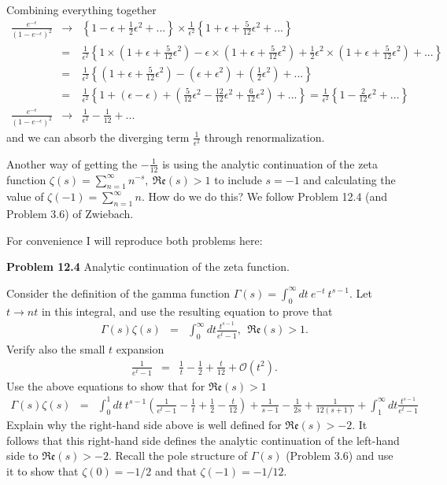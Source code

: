 \documentclass[aps,preprint,preprintnumbers,nofootinbib,showpacs,prd]{revtex4-1}
\newcommand{\nbea}{\begin{eqnarray*}}
\newcommand{\neea}{\end{eqnarray*}}
\begin{document}
Combining everything together
%
\nbea
\frac{e^{-\epsilon}}{(1-e^{-\epsilon})^2} & \rightarrow & \left \{ 1 - \epsilon + \frac{1}{2} \epsilon^2 + ... \right \} \times \frac{1}{\epsilon^2} \left \{ 1 + \epsilon + \frac{5}{12}\epsilon^2 + ... \right \} \\
& = & \frac{1}{\epsilon^2} \left \{ 1 \times \left ( 1 + \epsilon + \frac{5}{12}\epsilon^2 \right ) - \epsilon \times \left ( 1 + \epsilon + \frac{5}{12}\epsilon^2 \right ) + \frac{1}{2}\epsilon^2 \times \left ( 1 + \epsilon + \frac{5}{12}\epsilon^2 \right ) + ... \right \} \\
& = & \frac{1}{\epsilon^2} \left \{ \left ( 1 + \epsilon + \frac{5}{12}\epsilon^2 \right ) - \left ( \epsilon + \epsilon^2 \right ) + \left ( \frac{1}{2}\epsilon^2 \right ) + ... \right \} \\
& = & \frac{1}{\epsilon^2} \left \{ 1 + \left ( \epsilon - \epsilon \right ) + \left ( \frac{5}{12}\epsilon^2 - \frac{12}{12}\epsilon^2 + \frac{6}{12}\epsilon^2 \right ) + ... \right \} = \frac{1}{\epsilon^2} \left \{ 1 - \frac{2}{12}\epsilon^2  + ... \right \} \\
\frac{e^{-\epsilon}}{(1-e^{-\epsilon})^2} & \rightarrow & \frac{1}{\epsilon^2} - \frac{1}{12} + ...
\neea
%
and we can absorb the diverging term $\frac{1}{\epsilon^2}$ through renormalization.

Another way of getting the $-\frac{1}{12}$ is using the analytic continuation of the zeta function $\zeta(s) = \sum\limits_{n=1}^{\infty} n^{-s},~\mathfrak{Re}(s) > 1$ to include $s = -1$ and calculating the value of $\zeta(-1) = \sum\limits_{n=1}^{\infty} n$. How do we do this? We follow Problem 12.4 (and Problem 3.6) of Zwiebach. 

For convenience I will reproduce both problems here:

{\bf Problem 12.4} Analytic continuation of the zeta function.

Consider the definition of the gamma function $\Gamma(s) = \int_0^\infty dt ~e^{-t}~t^{s-1}$. Let $t \rightarrow nt$ in this integral, and use the resulting equation to prove that
%
\nbea
\Gamma(s)\zeta(s) & = & \int_0^\infty dt \frac{t^{s-1}}{e^t - 1}, ~~\mathfrak{Re}(s) > 1.
\neea
%
Verify also the small $t$ expansion
%
\nbea
\frac{1}{e^t-1} & = & \frac{1}{t} - \frac{1}{2} + \frac{t}{12} + \mathcal{O}(t^2).
\neea
%
Use the above equations to show that for $\mathfrak{Re}(s) > 1$
%
\nbea
\Gamma(s)\zeta(s) & = & \int_0^1 dt~t^{s-1} \left ( \frac{1}{e^t - 1} -\frac{1}{t} + \frac{1}{2} - \frac{t}{12}\right ) + \frac{1}{s-1} - \frac{1}{2s} + \frac{1}{12(s+1)} + \int_1^\infty dt \frac{t^{s-1}}{e^t - 1}
\neea
%
Explain why the right-hand side above is well defined for $\mathfrak{Re}(s) > -2$. It follows that this right-hand side defines the analytic continuation of the left-hand side to $\mathfrak{Re}(s) > -2$. Recall the pole structure of $\Gamma(s)$ (Problem 3.6) and use it to show that $\zeta(0) = -1/2$ and that $\zeta(-1) = -1/12$.
\end{document}
